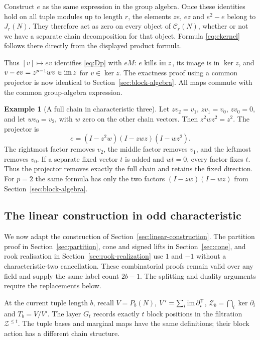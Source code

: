 \documentclass[11pt,a4paper]{article}
\theoremstyle{definition}\newtheorem{definition}[theorem]{Definition}
\newtheorem{example}[theorem]{Example}
\theoremstyle{remark}\newtheorem{remark}[theorem]{Remark}
\begin{document}
Construct $e$ as the same expression in the group algebra. Once these identities hold on all tuple modules up to length $r$, the elements $ze$, $ez$ and $e^2-e$ belong to $J_r(N)$. They therefore act as zero on every object of $\mathcal C_r(N)$, whether or not we have a separate chain decomposition for that object. Formula \eqref{eq:ekernel} follows there directly from the displayed product formula.

Thus $[v]\mapsto ev$ identifies \eqref{eq:Dp} with $eM$: $e$ kills $\operatorname{im} z$, its image is in $\ker z$, and $v-ev=z^{p-1}wv\in\operatorname{im} z$ for $v\in\ker z$. The exactness proof using a common projector is now identical to Section~\ref{sec:block-algebra}. All maps commute with the common group-algebra expression.

\begin{example}[A full chain in characteristic three]
Let $zv_2=v_1$, $zv_1=v_0$, $zv_0=0$, and let $wv_0=v_2$, with $w$ zero on the other chain vectors. Then $z^2wz^2=z^2$. The projector is
\[e=(I-z^2w)(I-zwz)(I-wz^2).
\]
The rightmost factor removes $v_2$, the middle factor removes $v_1$, and the leftmost removes $v_0$. If a separate fixed vector $t$ is added and $wt=0$, every factor fixes $t$. Thus the projector removes exactly the full chain and retains the fixed direction. For $p=2$ the same formula has only the two factors $(I-zw)(I-wz)$ from Section~\ref{sec:block-algebra}.
\end{example}

\subsection{The linear construction in odd characteristic}\label{sec:oddlinear}
We now adapt the construction of Section~\ref{sec:linear-construction}.
The partition proof in Section~\ref{sec:partition}, cone and signed
lifts in Section~\ref{sec:cone}, and rook realisation in
Section~\ref{sec:rook-realization} use $1$ and $-1$ without a
characteristic-two cancellation. These combinatorial proofs remain
valid over any field and supply the same label count $2b-1$.
The splitting and duality arguments require the replacements below.

At the current tuple length $b$, recall $V=P_b(N)$,
$V'=\sum_i\operatorname{im}\partial_i^{\mathsf T}$,
$\mathcal Z_b=\bigcap_i\ker\partial_i$ and $T_b=V/V'$.
The layer $G_t$ records exactly $t$ block positions in the filtration
$\mathcal Z^{\le t}$. The tuple bases and marginal maps have the
same definitions; their block action has a different chain structure.
\end{document}
